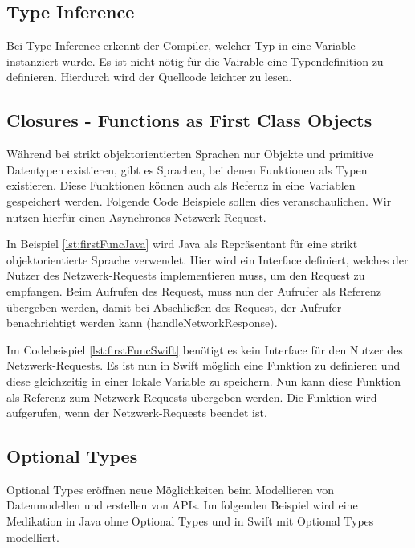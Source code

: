 \subsection{Type Inference}
Bei Type Inference erkennt der Compiler, welcher Typ in eine Variable instanziert wurde. Es ist nicht nötig für die Vairable eine Typendefinition zu definieren. Hierdurch wird der Quellcode leichter zu lesen. 


\subsection{Closures - Functions as First Class Objects}
Während bei strikt objektorientierten Sprachen nur Objekte und primitive Datentypen existieren, gibt es Sprachen, bei denen Funktionen als Typen existieren. Diese Funktionen können auch als Refernz in eine Variablen gespeichert werden. Folgende Code Beispiele sollen dies veranschaulichen. Wir nutzen hierfür einen Asynchrones Netzwerk-Request.

 In Beispiel \ref{lst:firstFuncJava} wird Java als Repräsentant für eine strikt objektorientierte Sprache verwendet. Hier wird ein Interface definiert, welches der Nutzer des Netzwerk-Requests implementieren muss, um den Request zu empfangen. Beim Aufrufen des Request, muss nun der Aufrufer als Referenz übergeben werden, damit bei Abschließen des Request, der Aufrufer benachrichtigt werden kann (handleNetworkResponse). 

Im Codebeispiel \ref{lst:firstFuncSwift} benötigt es kein Interface für den Nutzer des Netzwerk-Requests. Es ist nun in Swift möglich eine Funktion zu definieren und diese gleichzeitig in einer lokale Variable zu speichern. Nun kann diese Funktion als Referenz zum Netzwerk-Requests übergeben werden. Die Funktion wird aufgerufen, wenn der Netzwerk-Requests beendet ist. 


\subsection{Optional Types}
Optional Types eröffnen neue Möglichkeiten beim Modellieren von Datenmodellen und erstellen von APIs. Im folgenden Beispiel wird eine Medikation in Java ohne Optional Types und in Swift mit Optional Types modelliert.
 

